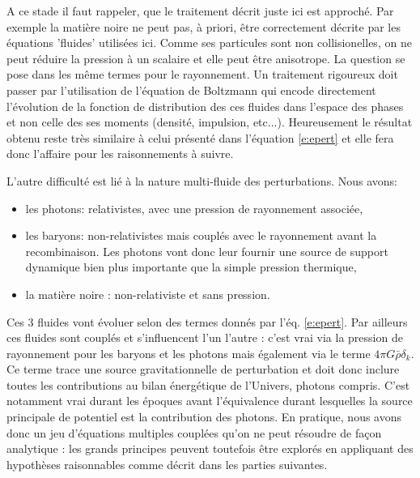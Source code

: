  A ce stade il faut rappeler, que le traitement décrit juste ici est approché. Par exemple la matière noire  ne peut pas, à priori, être correctement décrite par les équations 'fluides' utilisées ici. Comme ses particules sont non collisionelles, on ne peut réduire la pression à un scalaire et elle peut être anisotrope. La question se pose dans les même termes pour le rayonnement. Un traitement rigoureux doit passer par l'utilisation de l'équation de Boltzmann qui encode directement l'évolution de la fonction de distribution des ces fluides dans l'espace des phases et non celle des ses moments (densité, impulsion, etc...).  Heureusement le résultat obtenu reste très similaire à celui présenté dans l'équation \ref{e:epert} et elle fera donc l'affaire pour les raisonnements à suivre.
 
 L'autre difficulté est lié à la nature multi-fluide des perturbations. Nous avons:
 \begin{itemize}
 \item les photons: relativistes, avec une pression de rayonnement associée,
 \item les baryons: non-relativistes mais couplés avec le rayonnement avant la recombinaison. Les photons vont donc leur fournir une source de support dynamique bien plus importante que la simple pression thermique,
 \item la matière noire : non-relativiste et sans pression.
 \end{itemize}
 Ces 3 fluides vont évoluer selon des termes donnés par l'éq. \ref{e:epert}. Par ailleurs ces fluides sont couplés et s'influencent l'un l'autre : c'est vrai via la pression de rayonnement pour les baryons et les photons mais également via le terme $4\pi G \bar \rho \delta_k$. Ce terme trace une source gravitationnelle de perturbation et doit donc inclure toutes les contributions au bilan énergétique de l'Univers, photons compris. C'est notamment vrai durant les époques avant l'équivalence  durant lesquelles la source principale de potentiel est la contribution des photons. En pratique, nous avons donc un jeu d'équations multiples couplées qu'on ne peut résoudre de façon analytique : les grands principes peuvent toutefois être explorés en appliquant des hypothèses raisonnables comme décrit dans les parties suivantes.
 
